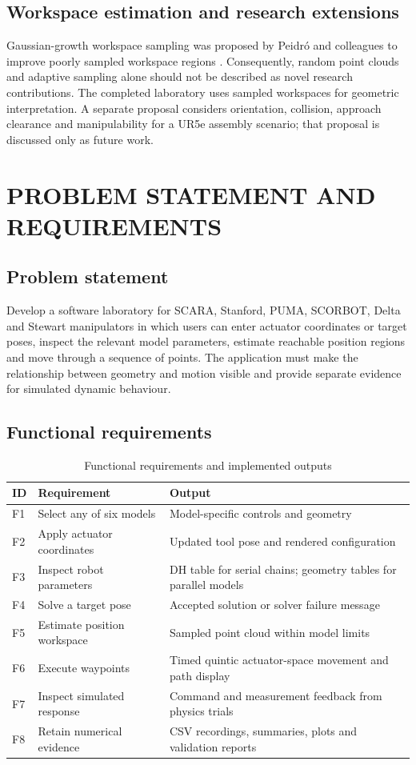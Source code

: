 \documentclass[11pt,a4paper,oneside]{report}
\begin{document}
\section{Workspace estimation and research extensions}
Gaussian-growth workspace sampling was proposed by Peidr\'{o} and colleagues to improve poorly sampled workspace regions \cite{gaussian}. Consequently, random point clouds and adaptive sampling alone should not be described as novel research contributions. The completed laboratory uses sampled workspaces for geometric interpretation. A separate proposal considers orientation, collision, approach clearance and manipulability for a UR5e assembly scenario; that proposal is discussed only as future work.

\chapter{PROBLEM STATEMENT AND REQUIREMENTS}
\section{Problem statement}
Develop a software laboratory for SCARA, Stanford, PUMA, SCORBOT, Delta and Stewart manipulators in which users can enter actuator coordinates or target poses, inspect the relevant model parameters, estimate reachable position regions and move through a sequence of points. The application must make the relationship between geometry and motion visible and provide separate evidence for simulated dynamic behaviour.

\section{Functional requirements}
\begin{table}[H]\centering\small
\caption{Functional requirements and implemented outputs}
\begin{tabularx}{\textwidth}{p{1cm}XX}\toprule
ID&Requirement&Output\\\midrule
F1&Select any of six models&Model-specific controls and geometry\\
F2&Apply actuator coordinates&Updated tool pose and rendered configuration\\
F3&Inspect robot parameters&DH table for serial chains; geometry tables for parallel models\\
F4&Solve a target pose&Accepted solution or solver failure message\\
F5&Estimate position workspace&Sampled point cloud within model limits\\
F6&Execute waypoints&Timed quintic actuator-space movement and path display\\
F7&Inspect simulated response&Command and measurement feedback from physics trials\\
F8&Retain numerical evidence&CSV recordings, summaries, plots and validation reports\\\bottomrule
\end{tabularx}
\end{table}
\end{document}
